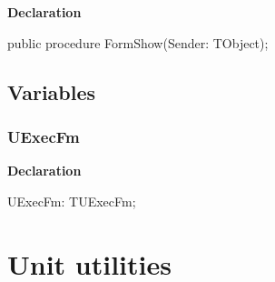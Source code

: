 \documentclass{report}
\newif\ifpdf
\begin{document}
\label{updexec.TUExecFm-FormShow}
\begin{list}{}{
\setlength{\itemindent}{0cm}
\setlength{\listparindent}{0cm}
\setlength{\leftmargin}{\evensidemargin}
\addtolength{\leftmargin}{\tmplength}
\settowidth{\labelsep}{X}
\addtolength{\leftmargin}{\labelsep}
\setlength{\labelwidth}{\tmplength}
}
\item[\textbf{Declaration}\hfill]
\ifpdf
\begin{flushleft}
\fi
\begin{ttfamily}
public procedure FormShow(Sender: TObject);\end{ttfamily}

\ifpdf
\end{flushleft}
\fi

\end{list}
\section{Variables}
\ifpdf
\subsection*{\large{\textbf{UExecFm}}\normalsize\hspace{1ex}\hrulefill}
\else
\subsection*{UExecFm}
\fi
\label{updexec-UExecFm}
\begin{list}{}{
\setlength{\itemindent}{0cm}
\setlength{\listparindent}{0cm}
\setlength{\leftmargin}{\evensidemargin}
\addtolength{\leftmargin}{\tmplength}
\settowidth{\labelsep}{X}
\addtolength{\leftmargin}{\labelsep}
\setlength{\labelwidth}{\tmplength}
}
\item[\textbf{Declaration}\hfill]
\ifpdf
\begin{flushleft}
\fi
\begin{ttfamily}
UExecFm: TUExecFm;\end{ttfamily}

\ifpdf
\end{flushleft}
\fi

\end{list}
\chapter{Unit utilities}
\label{utilities}
\end{document}

